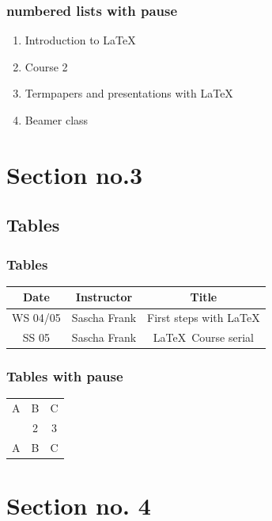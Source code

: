 \documentclass[hyperref={pdfpagelabels=false},aspectratio=169]{beamer}
\begin{document}
    \begin{frame}
        \frametitle{numbered lists with pause}
        \begin{enumerate}[<+->]
            \item Introduction to  \LaTeX{}  
            \item Course 2
            \item Termpapers and presentations with \LaTeX{}  
            \item Beamer class
        \end{enumerate}
    \end{frame}


    \section{Section no.3} 
    \subsection{Tables}
    \begin{frame}
        \frametitle{Tables}
        \begin{tabular}{|c|c|c|}
            \hline
            \textbf{Date} & \textbf{Instructor} & \textbf{Title} \\
            \hline
            WS 04/05 & Sascha Frank & First steps with  \LaTeX  \\
            \hline
            SS 05 & Sascha Frank & \LaTeX \ Course serial \\
            \hline
        \end{tabular}
    \end{frame}

    \begin{frame}
        \frametitle{Tables with pause}
        \begin{tabular}{c c c}
            A & B & C \\ 
            \pause 
            1 & 2 & 3 \\  
            \pause 
            A & B & C \\ 
        \end{tabular} 
    \end{frame}


    \section{Section no. 4}
\end{document}
